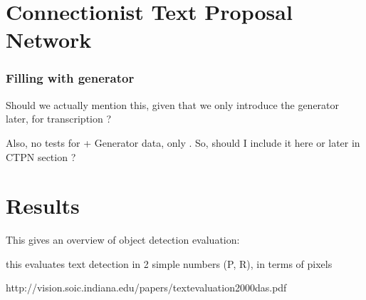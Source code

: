

\section{Connectionist Text Proposal Network}\label{sec:ctpn}





		\subsubsection{Filling with generator}
		\startToDo
			Should we actually mention this, given that we only introduce the generator later, for transcription ?

			Also, no tests for \FRCNN{} + Generator data, only \CTPN{}. So, should I include it here or later in CTPN section ?
		\stopToDo



\section{Results}\label{sec:detection_results}
	This gives an overview of object detection evaluation:


	this evaluates text detection in 2 simple numbers (P, R), in terms of pixels

	http://vision.soic.indiana.edu/papers/textevaluation2000das.pdf



